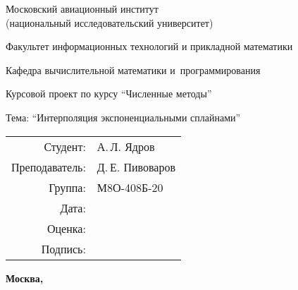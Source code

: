 \begin{titlepage}
\begin{center}
\bfseries

{\Large Московский авиационный институт\\ (национальный исследовательский университет)

}

\vspace{48pt}

{\large Факультет информационных технологий и прикладной математики
}

\vspace{36pt}

{\large Кафедра вычислительной математики и~программирования

}


\vspace{48pt}

Курсовой проект по курсу \enquote{Численные методы}

Тема: \enquote{Интерполяция экспоненциальными сплайнами}

\end{center}

\vspace{72pt}

\begin{flushright}
\begin{tabular}{rl}
Студент: & А.\,Л. Ядров \\
Преподаватель: & Д.\,Е. Пивоваров \\
Группа: & М8О-408Б-20 \\
Дата: & \\
Оценка: & \\
Подпись: & \\
\end{tabular}
\end{flushright}

\vfill

\begin{center}
\bfseries
Москва, \the\year
\end{center}
\end{titlepage}

\pagebreak
